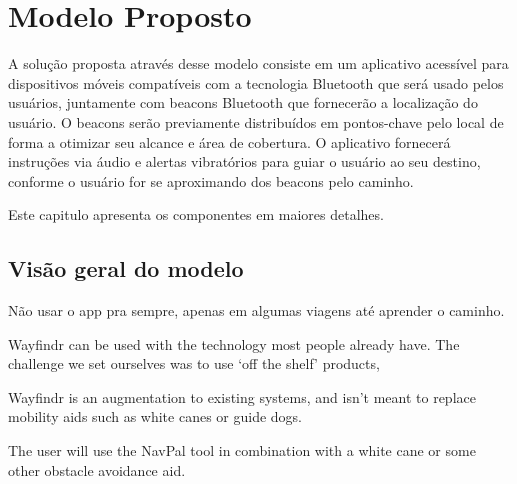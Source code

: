 \documentclass[english,brazilian]{UNISINOSmonografia}
\begin{document}
\chapter{Modelo Proposto}

A solução proposta através desse modelo consiste em um aplicativo acessível para dispositivos móveis compatíveis com a tecnologia Bluetooth que será usado pelos usuários, juntamente com beacons Bluetooth que fornecerão a localização do usuário. O beacons serão previamente distribuídos em pontos-chave pelo local de forma a otimizar seu alcance e área de cobertura. O aplicativo fornecerá instruções via áudio e alertas vibratórios para guiar o usuário ao seu destino, conforme o usuário for se aproximando dos beacons pelo caminho.

Este capitulo apresenta os componentes em maiores detalhes.

\section{Visão geral do modelo}



Não usar o app pra sempre, apenas em algumas viagens até aprender o caminho.

Wayfindr can be used with the technology most people already have. 
 The challenge we set ourselves was to use ‘off the shelf’ products,

Wayfindr is an augmentation to existing systems, and isn’t meant to replace mobility aids such as white canes or guide dogs.

The user will use the NavPal tool in combination with a white cane or some other obstacle avoidance aid.
\end{document}
